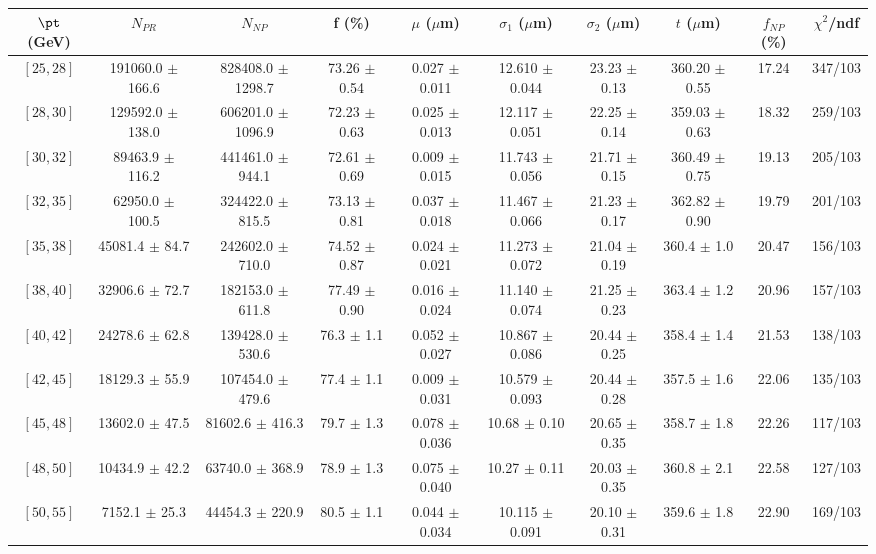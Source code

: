 \begin{tabular}{c||c|c|c|c|c|c|c||c|c}
$\pt$ (GeV) & $N_{PR}$ & $N_{NP}$ & f (\%) & $\mu$ ($\mu$m) & $\sigma_1$ ($\mu$m) & $\sigma_2$ ($\mu$m)  & $t$ ($\mu$m) & $f_{NP}$ (\%) & $\chi^2$/ndf \\
\hline
$[25, 28]$ & 191060.0 $\pm$ 166.6 & 828408.0 $\pm$ 1298.7 & 73.26 $\pm$ 0.54 & 0.027 $\pm$ 0.011 & 12.610 $\pm$ 0.044 & 23.23 $\pm$ 0.13 & 360.20 $\pm$ 0.55 & 17.24 & 347/103\\
$[28, 30]$ & 129592.0 $\pm$ 138.0 & 606201.0 $\pm$ 1096.9 & 72.23 $\pm$ 0.63 & 0.025 $\pm$ 0.013 & 12.117 $\pm$ 0.051 & 22.25 $\pm$ 0.14 & 359.03 $\pm$ 0.63 & 18.32 & 259/103\\
$[30, 32]$ & 89463.9 $\pm$ 116.2 & 441461.0 $\pm$ 944.1 & 72.61 $\pm$ 0.69 & 0.009 $\pm$ 0.015 & 11.743 $\pm$ 0.056 & 21.71 $\pm$ 0.15 & 360.49 $\pm$ 0.75 & 19.13 & 205/103\\
$[32, 35]$ & 62950.0 $\pm$ 100.5 & 324422.0 $\pm$ 815.5 & 73.13 $\pm$ 0.81 & 0.037 $\pm$ 0.018 & 11.467 $\pm$ 0.066 & 21.23 $\pm$ 0.17 & 362.82 $\pm$ 0.90 & 19.79 & 201/103\\
$[35, 38]$ & 45081.4 $\pm$ 84.7 & 242602.0 $\pm$ 710.0 & 74.52 $\pm$ 0.87 & 0.024 $\pm$ 0.021 & 11.273 $\pm$ 0.072 & 21.04 $\pm$ 0.19 & 360.4 $\pm$ 1.0 & 20.47 & 156/103\\
$[38, 40]$ & 32906.6 $\pm$ 72.7 & 182153.0 $\pm$ 611.8 & 77.49 $\pm$ 0.90 & 0.016 $\pm$ 0.024 & 11.140 $\pm$ 0.074 & 21.25 $\pm$ 0.23 & 363.4 $\pm$ 1.2 & 20.96 & 157/103\\
$[40, 42]$ & 24278.6 $\pm$ 62.8 & 139428.0 $\pm$ 530.6 & 76.3 $\pm$ 1.1 & 0.052 $\pm$ 0.027 & 10.867 $\pm$ 0.086 & 20.44 $\pm$ 0.25 & 358.4 $\pm$ 1.4 & 21.53 & 138/103\\
$[42, 45]$ & 18129.3 $\pm$ 55.9 & 107454.0 $\pm$ 479.6 & 77.4 $\pm$ 1.1 & 0.009 $\pm$ 0.031 & 10.579 $\pm$ 0.093 & 20.44 $\pm$ 0.28 & 357.5 $\pm$ 1.6 & 22.06 & 135/103\\
$[45, 48]$ & 13602.0 $\pm$ 47.5 & 81602.6 $\pm$ 416.3 & 79.7 $\pm$ 1.3 & 0.078 $\pm$ 0.036 & 10.68 $\pm$ 0.10 & 20.65 $\pm$ 0.35 & 358.7 $\pm$ 1.8 & 22.26 & 117/103\\
$[48, 50]$ & 10434.9 $\pm$ 42.2 & 63740.0 $\pm$ 368.9 & 78.9 $\pm$ 1.3 & 0.075 $\pm$ 0.040 & 10.27 $\pm$ 0.11 & 20.03 $\pm$ 0.35 & 360.8 $\pm$ 2.1 & 22.58 & 127/103\\
$[50, 55]$ & 7152.1 $\pm$ 25.3 & 44454.3 $\pm$ 220.9 & 80.5 $\pm$ 1.1 & 0.044 $\pm$ 0.034 & 10.115 $\pm$ 0.091 & 20.10 $\pm$ 0.31 & 359.6 $\pm$ 1.8 & 22.90 & 169/103\\

\end{tabular}
